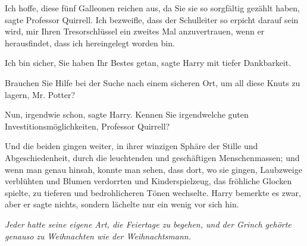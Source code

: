 \glqq{}Ich hoffe, diese fünf Galleonen reichen aus, da Sie sie so sorgfältig
gezählt haben\grqq{}, sagte Professor Quirrell. \glqq{}Ich bezweifle, dass der
Schulleiter so erpicht darauf sein wird, mir Ihren Tresorschlüssel ein zweites
Mal anzuvertrauen, wenn er herausfindet, dass ich hereingelegt worden bin.\grqq{}

\glqq{}Ich bin sicher, Sie haben Ihr Bestes getan\grqq{}, sagte Harry mit tiefer
Dankbarkeit.

\glqq{}Brauchen Sie Hilfe bei der Suche nach einem sicheren Ort, um all diese
Knuts zu lagern, Mr. Potter?\grqq{}

\glqq{}Nun, irgendwie schon\grqq{}, sagte Harry. \glqq{}Kennen Sie irgendwelche
guten Investitionsmöglichkeiten, Professor Quirrell?\grqq{}

Und die beiden gingen weiter, in ihrer winzigen Sphäre der Stille und
Abgeschiedenheit, durch die leuchtenden und geschäftigen Menschenmassen; und
wenn man genau hinsah, konnte man sehen, dass dort, wo sie gingen, Laubzweige
verblühten und Blumen verdorrten und Kinderspielzeug, das fröhliche Glocken
spielte, zu tieferen und bedrohlicheren Tönen wechselte. Harry bemerkte es zwar,
aber er sagte nichts, sondern lächelte nur ein wenig vor sich hin.

\emph{Jeder hatte seine eigene Art, die Feiertage zu begehen, und der Grinch
gehörte genauso zu Weihnachten wie der Weihnachtsmann.}

